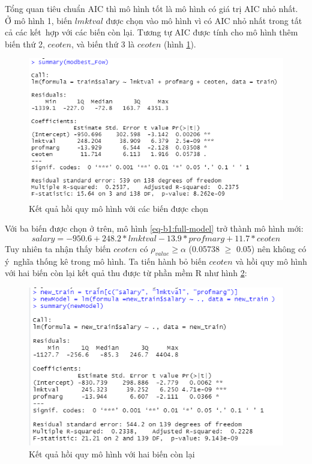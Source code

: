 Tổng quan tiêu chuẩn AIC thì mô hình tốt là mô hình có giá trị AIC nhỏ nhất. Ở mô hình 1, biến $\textit{lmktval}$ được chọn vào mô hình vì có AIC nhỏ nhất trong tất cả các kết~hợp với các biến còn lại. Tương tự AIC được tính cho mô hình thêm biến thứ 2, $\textit{ceoten}$, và biến thứ 3 là $\textit{ceoten}$ (hình \ref{ex1:model:1}).

\begin{figure}[H]
	\centering
	\includegraphics[width=.7\linewidth]{../Photo Of Result/B1_summary.PNG}  
	\caption{Kết quả hồi quy mô hình với các biến được chọn}
	\label{ex1:model:1}
\end{figure}

Với ba biến được chọn ở trên, mô hình \ref{eq-b1:full-model} trở thành mô hình mới:
\begin{equation}\label{1.2}
\textit{salary} = -950.6 + 248.2 * \textit{lmktval} - 13.9 *\textit{profmarg} + 11.7  *\textit{ceoten}
\end{equation}
Tuy nhiên ta nhận thấy biến $\textit{ceoten}$ có $\rho_{value} \ge \alpha$ (0.05738 $\ge$ 0.05) nên không có ý~nghĩa thống kê trong mô hình. Ta tiến hành bỏ biến $\textit{ceoten}$ và hồi quy mô hình với hai biến còn lại kết quả thu được từ phần mềm R như hình \ref{fig-b1:new-summary}:

\begin{figure}[H]
	\centering
	\includegraphics[width=.7\linewidth]{../Photo Of Result/B1_newsummary.PNG}  
	\caption{Kết quả hồi quy mô hình với hai biến còn lại}
	\label{fig-b1:new-summary}
\end{figure}

